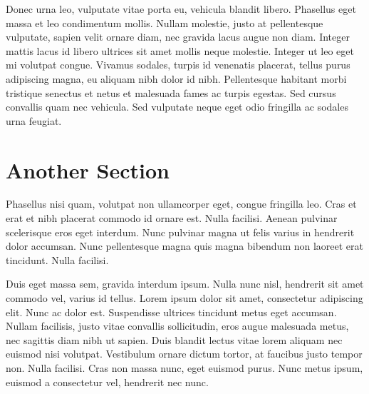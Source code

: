 Donec urna leo, vulputate vitae porta eu, vehicula blandit libero. Phasellus eget massa et leo condimentum mollis. Nullam molestie, justo at pellentesque vulputate, sapien velit ornare diam, nec gravida lacus augue non diam. Integer mattis lacus id libero ultrices sit amet mollis neque molestie. Integer ut leo eget mi volutpat congue. Vivamus sodales, turpis id venenatis placerat, tellus purus adipiscing magna, eu aliquam nibh dolor id nibh. Pellentesque habitant morbi tristique senectus et netus et malesuada fames ac turpis egestas. Sed cursus convallis quam nec vehicula. Sed vulputate neque eget odio fringilla ac sodales urna feugiat.

\section{Another Section}

Phasellus nisi quam, volutpat non ullamcorper eget, congue fringilla leo. Cras et erat et nibh placerat commodo id ornare est. Nulla facilisi. Aenean pulvinar scelerisque eros eget interdum. Nunc pulvinar magna ut felis varius in hendrerit dolor accumsan. Nunc pellentesque magna quis magna bibendum non laoreet erat tincidunt. Nulla facilisi.

Duis eget massa sem, gravida interdum ipsum. Nulla nunc nisl, hendrerit sit amet commodo vel, varius id tellus. Lorem ipsum dolor sit amet, consectetur adipiscing elit. Nunc ac dolor est. Suspendisse ultrices tincidunt metus eget accumsan. Nullam facilisis, justo vitae convallis sollicitudin, eros augue malesuada metus, nec sagittis diam nibh ut sapien. Duis blandit lectus vitae lorem aliquam nec euismod nisi volutpat. Vestibulum ornare dictum tortor, at faucibus justo tempor non. Nulla facilisi. Cras non massa nunc, eget euismod purus. Nunc metus ipsum, euismod a consectetur vel, hendrerit nec nunc.